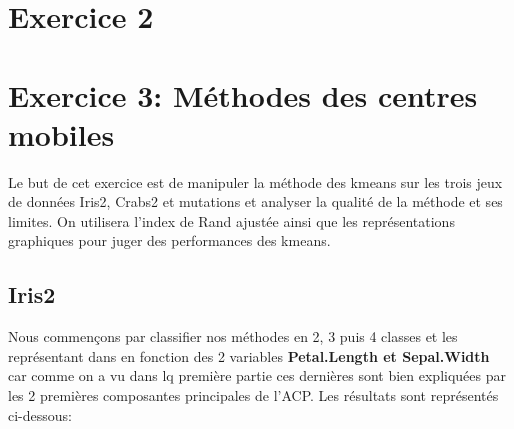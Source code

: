 \documentclass[10pt]{article}
\begin{document}
	\section{ Exercice 2}
	\section{ Exercice 3: Méthodes des centres mobiles}
	Le but de cet exercice est de manipuler la méthode des kmeans sur les trois jeux de données Iris2, Crabs2 et mutations et analyser la qualité de la méthode et ses limites. On utilisera l'index de Rand ajustée ainsi que les représentations graphiques pour juger des performances des kmeans.
	\subsection{Iris2}
	Nous commençons par classifier nos méthodes en 2, 3 puis 4 classes et les représentant dans en fonction des 2 variables \textbf{Petal.Length et Sepal.Width} car comme on a vu dans lq première partie ces dernières sont bien expliquées par les 2 premières composantes principales de l'ACP.  Les résultats sont représentés ci-dessous:
	
\end{document}
